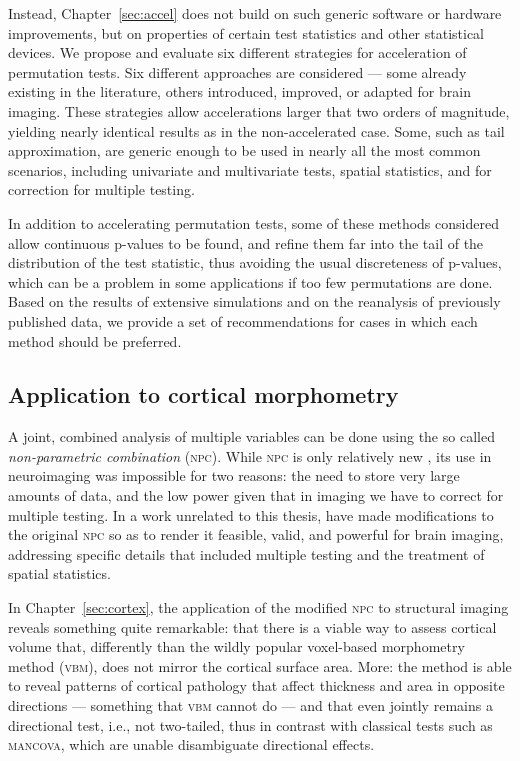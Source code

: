 Instead, Chapter~\ref{sec:accel} does not build on such generic software or hardware improvements, but on properties of certain test statistics and other statistical devices. We propose and evaluate six different strategies for acceleration of permutation tests. Six different approaches are considered --- some already existing in the literature, others introduced, improved, or adapted for brain imaging. These strategies allow accelerations larger that two orders of magnitude, yielding nearly identical results as in the non-accelerated case. Some, such as tail approximation, are generic enough to be used in nearly all the most common scenarios, including univariate and multivariate tests, spatial statistics, and for correction for multiple testing.

In addition to accelerating permutation tests, some of these methods considered allow continuous p-values to be found, and refine them far into the tail of the distribution of the test statistic, thus avoiding the usual discreteness of p-values, which can be a problem in some applications if too few permutations are done. Based on the results of extensive simulations and on the reanalysis of previously published data, we provide a set of recommendations for cases in which each method should be preferred.

\subsection{Application to cortical morphometry}

A joint, combined analysis of multiple variables can be done using the so called \emph{non-parametric combination} (\textsc{npc}). While \textsc{npc} is only relatively new \citep{Pesarin2010}, its use in neuroimaging was impossible for two reasons: the need to store very large amounts of data, and the low power given that in imaging we have to correct for multiple testing. In a work unrelated to this thesis, \citet{Winkler2016_npc} have made modifications to the original \textsc{npc} so as to render it feasible, valid, and powerful for brain imaging, addressing specific details that included multiple testing and the treatment of spatial statistics.

In Chapter~\ref{sec:cortex}, the application of the modified \textsc{npc} to structural imaging reveals something quite remarkable: that there is a viable way to assess cortical volume that, differently than the wildly popular voxel-based morphometry method (\textsc{vbm}), does not mirror the cortical surface area. More: the method is able to reveal patterns of cortical pathology that affect thickness and area in opposite directions --- something that \textsc{vbm} cannot do --- and that even jointly remains a directional test, i.e., not two-tailed, thus in contrast with classical tests such as \textsc{mancova}, which are unable disambiguate directional effects.

